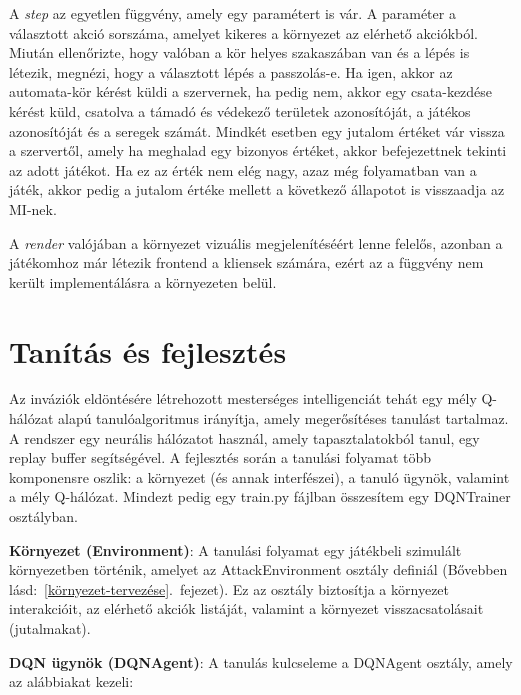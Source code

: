 \documentclass[
]{thesis-ekf}
\theoremstyle{definition}
\theoremstyle{remark}
\begin{document}
A \emph{step} az egyetlen függvény, amely egy paramétert is vár. A paraméter a választott akció sorszáma, amelyet kikeres a környezet az elérhető akciókból. Miután ellenőrizte, hogy valóban a kör helyes szakaszában van és a lépés is létezik, megnézi, hogy a választott lépés a passzolás-e. Ha igen, akkor az automata-kör kérést küldi a szervernek, ha pedig nem, akkor egy csata-kezdése kérést küld, csatolva a támadó és védekező területek azonosítóját, a játékos azonosítóját és a seregek számát. Mindkét esetben egy jutalom értéket vár vissza a szervertől, amely ha meghalad egy bizonyos értéket, akkor befejezettnek tekinti az adott játékot. Ha ez az érték nem elég nagy, azaz még folyamatban van a játék, akkor pedig a jutalom értéke mellett a következő állapotot is visszaadja az MI-nek. 

A \emph{render} valójában a környezet vizuális megjelenítéséért lenne felelős, azonban a játékomhoz már létezik frontend a kliensek számára, ezért az a függvény nem került implementálásra a környezeten belül.

\section{Tanítás és fejlesztés}

Az inváziók eldöntésére létrehozott mesterséges intelligenciát tehát egy mély Q-hálózat alapú tanulóalgoritmus irányítja, amely megerősítéses tanulást tartalmaz. A rendszer egy neurális hálózatot használ, amely tapasztalatokból tanul, egy replay buffer segítségével. A fejlesztés során a tanulási folyamat több komponensre oszlik: a környezet (és annak interfészei), a tanuló ügynök, valamint a mély Q-hálózat. Mindezt pedig egy train.py fájlban összesítem egy DQNTrainer osztályban.

\textbf{Környezet (Environment)}: A tanulási folyamat egy játékbeli szimulált környezetben történik, amelyet az AttackEnvironment osztály definiál (Bővebben lásd:~\ref{környezet-tervezése}.~fejezet). Ez az osztály biztosítja a környezet interakcióit, az elérhető akciók listáját, valamint a környezet visszacsatolásait (jutalmakat).

\textbf{DQN ügynök (DQNAgent)}: A tanulás kulcseleme a DQNAgent osztály, amely az alábbiakat kezeli:
\end{document}
